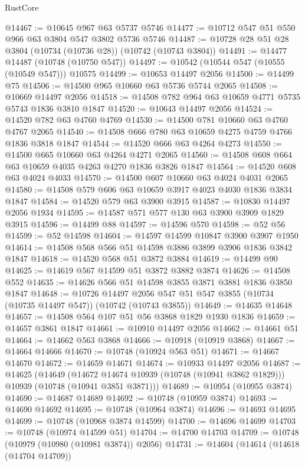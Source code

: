 \begin{lexlean}{RustCore}
\begin{coremodule}
@14467 := @10645 @967 @63 @5737 @5746
@14477 := @10712 @547 @51 @550 @966 @63 @3804 @547 @3802 @5736 @5746
@14487 := @10728 @28 @51 @28 @3804 (@10734 (@10736 @28)) (@10742 (@10743 @3804))
@14491 := @14477 @14487 (@10748 (@10750 @547))
@14497 := @10542 (@10544 @547 (@10555 (@10549 @547))) @10575
@14499 := @10653 @14497 @2056
@14500 := @14499 @75
@14506 := @14500 @965 @10660 @63 @5736 @5744 @2065
@14508 := @10669 @14497 @2056
@14518 := @14508 @782 @964 @63 @10659 @4771 @5735 @5743 @1836 @3810 @1847
@14520 := @10643 @14497 @2056
@14524 := @14520 @782 @63 @4760 @4769
@14530 := @14500 @781 @10660 @63 @4760 @4767 @2065
@14540 := @14508 @666 @780 @63 @10659 @4275 @4759 @4766 @1836 @3818 @1847
@14544 := @14520 @666 @63 @4264 @4273
@14550 := @14500 @665 @10660 @63 @4264 @4271 @2065
@14560 := @14508 @608 @664 @63 @10659 @4035 @4263 @4270 @1836 @3826 @1847
@14564 := @14520 @608 @63 @4024 @4033
@14570 := @14500 @607 @10660 @63 @4024 @4031 @2065
@14580 := @14508 @579 @606 @63 @10659 @3917 @4023 @4030 @1836 @3834 @1847
@14584 := @14520 @579 @63 @3900 @3915
@14587 := @10830 @14497 @2056 @1934
@14595 := @14587 @571 @577 @130 @63 @3900 @3909 @1829 @3915
@14596 := @14499 @88
@14597 := @14596 @570
@14598 := @52 @56
@14599 := @52 @14598
@14604 := @14597 @14599 @10847 @3900 @3907 @1950
@14614 := @14508 @568 @566 @51 @14598 @3886 @3899 @3906 @1836 @3842 @1847
@14618 := @14520 @568 @51 @3872 @3884
@14619 := @14499 @90
@14625 := @14619 @567 @14599 @51 @3872 @3882 @3874
@14626 := @14508 @552
@14635 := @14626 @566 @51 @14598 @3855 @3871 @3881 @1836 @3850 @1847
@14648 := @10726
    @14497
    @2056
    @547
    @51
    @547
    @3855
    (@10734 (@10735 @14497 @547))
    (@10742 (@10743 @3855))
@14649 := @14635 @14648
@14657 := @14508 @564 @107 @51 @56 @3868 @1829 @1930 @1836
@14659 := @14657 @3861 @1847
@14661 := @10910 @14497 @2056
@14662 := @14661 @51
@14664 := @14662 @563 @3868
@14666 := @10918 (@10919 @3868)
@14667 := @14664 @14666
@14670 := @10748 (@10924 @563 @51)
@14671 := @14667 @14670
@14672 := @14659 @14671
@14674 := @10933 @14497 @2056
@14687 := @14625
    (@14649
      (@14672 @14674 @10939 (@10748 (@10941 @3862 @1829)))
      @10939
      (@10748 (@10941 @3851 @3871)))
@14689 := @10954 (@10955 @3874)
@14690 := @14687 @14689
@14692 := @10748 (@10959 @3874)
@14693 := @14690 @14692
@14695 := @10748 (@10964 @3874)
@14696 := @14693 @14695
@14699 := @10748 (@10968 @3874 @14599)
@14700 := @14696 @14699
@14703 := @10748 (@10974 @14599 @51)
@14704 := @14700 @14703
@14709 := @10748 (@10979 (@10980 (@10981 @3874)) @2056)
@14731 := @14604
    (@14614
      (@14618 (@14704 @14709))

\end{coremodule}
\end{lexlean}
